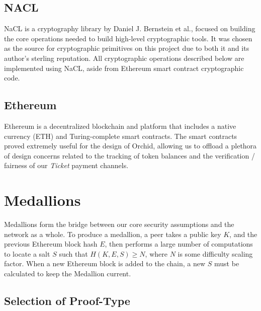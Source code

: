 \documentclass{article}
\newcommand{\mesh}{Orchid}
\begin{document}
\subsection{NACL}

NaCL \cite{nacl} is a cryptography library by Daniel J. Bernstein et al., focused on building the core operations needed to build high-level cryptographic tools. It was chosen as the source for cryptographic primitives on this project due to both it and its author's sterling reputation. All cryptographic operations described below are implemented using NaCL, aside from Ethereum smart contract cryptographic code.

\subsection{Ethereum}

Ethereum \cite{29} is a decentralized blockchain and platform that includes a native currency (ETH) and Turing-complete smart contracts. The smart contracts proved extremely useful for the design of \mesh{}, allowing us to offload a plethora of design concerns related to the tracking of token balances and the verification / fairness of our \emph{Ticket} payment channels.

\section{Medallions}
\label{medallions}

Medallions form the bridge between our core security assumptions and the network as a whole. To produce a medallion, a peer takes a public key $K$, and the previous Ethereum block hash $E$, then performs a large number of computations to locate a salt $S$ such that $H(K, E, S) \geq N$, where $N$ is some difficulty scaling factor. When a new Ethereum block is added to the chain, a new $S$ must be calculated to keep the Medallion current.


\subsection{Selection of Proof-Type}
\end{document}
